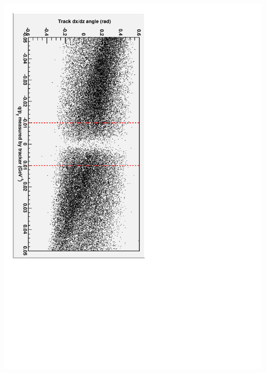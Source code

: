 \documentclass[compress]{beamer}
\begin{document}
\begin{frame}
\begin{columns}
\includegraphics[height=\linewidth, angle=90]{sawtooth_and_qoverpt2.pdf}
\end{columns}
\end{frame}
\end{document}
